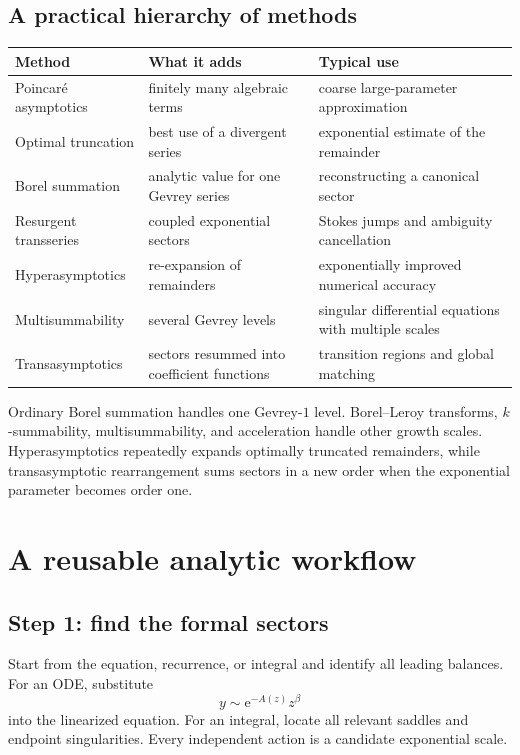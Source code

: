 \documentclass[11pt,oneside]{book}
\theoremstyle{definition}
\theoremstyle{remark}
\newcommand{\e}{\mathrm{e}}
\begin{document}
\section{A practical hierarchy of methods}

\begin{longtable}{@{}p{}p{}p{}@{}}
\toprule
Method & What it adds & Typical use\\
\midrule
Poincar\'e asymptotics & finitely many algebraic terms & coarse large-parameter approximation\\
Optimal truncation & best use of a divergent series & exponential estimate of the remainder\\
Borel summation & analytic value for one Gevrey series & reconstructing a canonical sector\\
Resurgent transseries & coupled exponential sectors & Stokes jumps and ambiguity cancellation\\
Hyperasymptotics & re-expansion of remainders & exponentially improved numerical accuracy\\
Multisummability & several Gevrey levels & singular differential equations with multiple scales\\
Transasymptotics & sectors resummed into coefficient functions & transition regions and global matching\\
\bottomrule
\end{longtable}

\begin{summarybox}
Ordinary Borel summation handles one Gevrey-$1$ level. Borel--Leroy transforms,
$k$-summability, multisummability, and acceleration handle other growth scales.
Hyperasymptotics repeatedly expands optimally truncated remainders, while
transasymptotic rearrangement sums sectors in a new order when the exponential
parameter becomes order one.
\end{summarybox}


\chapter{A reusable analytic workflow}
\label{ch:analytic-workflow}

\section{Step 1: find the formal sectors}

Start from the equation, recurrence, or integral and identify all leading
balances. For an ODE, substitute
\[
  y\sim\e^{-A(z)}z^\beta
\]
into the linearized equation. For an integral, locate all relevant saddles and
endpoint singularities. Every independent action is a candidate exponential
scale.
\end{document}
